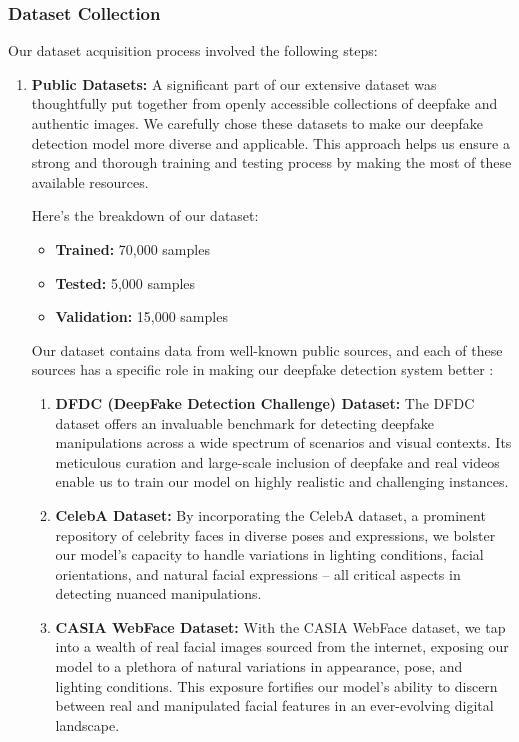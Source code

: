 \subsubsection{Dataset Collection}

\noindent Our dataset acquisition process involved the following steps:

\begin{enumerate}
    \item \textbf{Public Datasets:} A significant part of our extensive dataset was thoughtfully put together from openly accessible collections of deepfake and authentic images. We carefully chose these datasets to make our deepfake detection model more diverse and applicable. This approach helps us ensure a strong and thorough training and testing process by making the most of these available resources.

          Here's the breakdown of our dataset:
          \begin{itemize}
              \item \textbf{Trained:} 70,000 samples
              \item \textbf{Tested:} 5,000 samples
              \item \textbf{Validation:} 15,000 samples
          \end{itemize}
          Our dataset contains data from well-known public sources, and each of these sources has a specific role in making our deepfake detection system better :

          \begin{enumerate}
              \item \textbf{DFDC (DeepFake Detection Challenge) Dataset:} The DFDC dataset offers an invaluable benchmark for detecting deepfake manipulations across a wide spectrum of scenarios and visual contexts. Its meticulous curation and large-scale inclusion of deepfake and real videos enable us to train our model on highly realistic and challenging instances.

              \item \textbf{CelebA Dataset:} By incorporating the CelebA dataset, a prominent repository of celebrity faces in diverse poses and expressions, we bolster our model's capacity to handle variations in lighting conditions, facial orientations, and natural facial expressions – all critical aspects in detecting nuanced manipulations.

              \item \textbf{CASIA WebFace Dataset:} With the CASIA WebFace dataset, we tap into a wealth of real facial images sourced from the internet, exposing our model to a plethora of natural variations in appearance, pose, and lighting conditions. This exposure fortifies our model's ability to discern between real and manipulated facial features in an ever-evolving digital landscape.
          \end{enumerate}



\end{enumerate}
